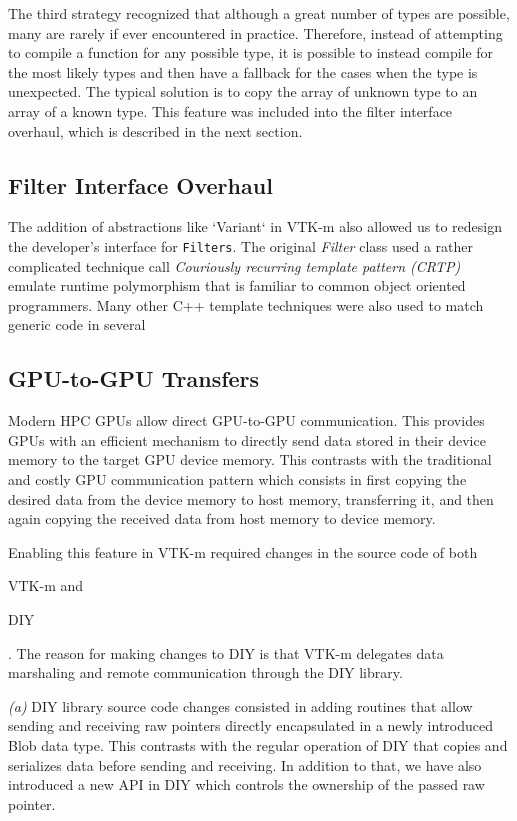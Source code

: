 The third strategy recognized that although a great number of types are possible, many are rarely if ever encountered in practice.
Therefore, instead of attempting to compile a function for any possible type, it is possible to instead compile for the most likely types and then have a fallback for the cases when the type is unexpected.
The typical solution is to copy the array of unknown type to an array of a known type.
This feature was included into the filter interface overhaul, which is described in the next section.

\subsection{Filter Interface Overhaul}


The addition of abstractions like `Variant` in VTK-m also allowed us to redesign the developer's interface for \texttt{Filters}. The original \textit{Filter} class used a rather complicated technique call \emph{Couriously recurring template pattern (CRTP)} emulate runtime polymorphism that is familiar to common object oriented programmers. Many other C++ template techniques were also used to match generic code in several \textit{}

\subsection{GPU-to-GPU Transfers}

Modern HPC GPUs allow direct GPU-to-GPU communication. This provides GPUs with an efficient mechanism to directly send data stored in their device memory to the target GPU device memory. This contrasts with the traditional and costly GPU communication pattern which consists in first copying the desired data from the device memory to host memory, transferring it, and then again copying the received data from host memory to device memory.

Enabling this feature in VTK-m required changes in the source code of both \begin{enumerate*} [label=\itshape(\alph*\upshape)]\item VTK-m and \item DIY\end{enumerate*}. The reason for making changes to DIY is that VTK-m delegates data marshaling and remote communication through the DIY library.

\textit{(a)} DIY library source code changes consisted in adding routines that allow sending and receiving raw pointers directly encapsulated in a newly introduced Blob data type. This contrasts with the regular operation of DIY that copies and serializes data before sending and receiving. In addition to that, we have also introduced a new API in DIY which controls the ownership of the passed raw pointer.

